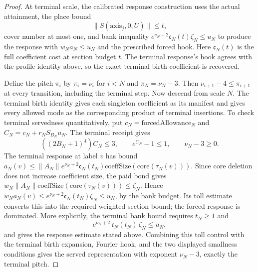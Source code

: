 \begin{proof}
At terminal scale, the calibrated response construction uses the actual attainment, the place bound
\[
 \|S(\mathrm{axis}_j,0,U)\|\leq t,
\]
cover number at most one, and bank inequality $e^{\nu_N+2}\mathfrak c_N(t)\zeta_N\leq u_N$ to produce the response with $w_Na_N\leq u_N$ and the prescribed forced hook. Here $\mathfrak c_N(t)$ is the full coefficient cost at section budget $t$. The terminal response's hook agrees with the profile identity above, so the exact terminal birth coefficient is recovered.

Define the pitch $\pi_i$ by $\pi_i=\nu_i$ for $i<N$ and $\pi_N=\nu_N-3$. Then $\nu_{i+1}-4\leq\pi_{i+1}$ at every transition, including the terminal step. Now descend from scale $N$. The terminal birth identity gives each singleton coefficient as its manifest and gives every allowed mode as the corresponding product of terminal insertions. To check terminal servedness quantitatively, put $c_N=\mathrm{forcedAllowance}_N$ and $C_N=c_N+r_NS_{B_N}u_N$. The terminal receipt gives
\[
 ((2B_N+1)^4)C_N\leq3,\qquad e^{C_N}-1\leq1,\qquad \nu_N-3\geq0.
\]
The terminal response at label $v$ has bound $a_N(v)\leq\|A_N\|e^{\nu_N+2}\mathfrak c_N(t_N)\mathrm{coeffSize}(\mathrm{core}(\tau_N(v)))$. Since core deletion does not increase coefficient size, the paid bond gives $w_N\|A_N\|\mathrm{coeffSize}(\mathrm{core}(\tau_N(v)))\leq\zeta_N$. Hence $w_Na_N(v)\leq e^{\nu_N+2}\mathfrak c_N(t_N)\zeta_N\leq u_N$, by the bank budget. Its toll estimate converts this into the required weighted section bound; the forced response is dominated. More explicitly, the terminal bank bound requires $t_N\geq1$ and
\[
 e^{\nu_N+2}\,\mathfrak c_N(t_N)\,\zeta_N\leq u_N,
\]
and gives the response estimate stated above. Combining this toll control with the terminal birth expansion, Fourier hook, and the two displayed smallness conditions gives the served representation with exponent $\nu_N-3$, exactly the terminal pitch.


\end{proof}
